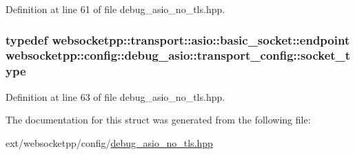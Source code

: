Definition at line 61 of file debug\+\_\+asio\+\_\+no\+\_\+tls.\+hpp.

\hypertarget{structwebsocketpp_1_1config_1_1debug__asio_1_1transport__config_a6c62fefe51c2bdfec796778773aa6d8e}{}
\subsubsection[{socket\+\_\+type}]{\setlength{\rightskip}{0pt plus 5cm}typedef {\bf websocketpp\+::transport\+::asio\+::basic\+\_\+socket\+::endpoint} {\bf websocketpp\+::config\+::debug\+\_\+asio\+::transport\+\_\+config\+::socket\+\_\+type}}\label{structwebsocketpp_1_1config_1_1debug__asio_1_1transport__config_a6c62fefe51c2bdfec796778773aa6d8e}


Definition at line 63 of file debug\+\_\+asio\+\_\+no\+\_\+tls.\+hpp.



The documentation for this struct was generated from the following file\+:\begin{DoxyCompactItemize}
\item 
ext/websocketpp/config/\hyperlink{debug__asio__no__tls_8hpp}{debug\+\_\+asio\+\_\+no\+\_\+tls.\+hpp}\end{DoxyCompactItemize}

